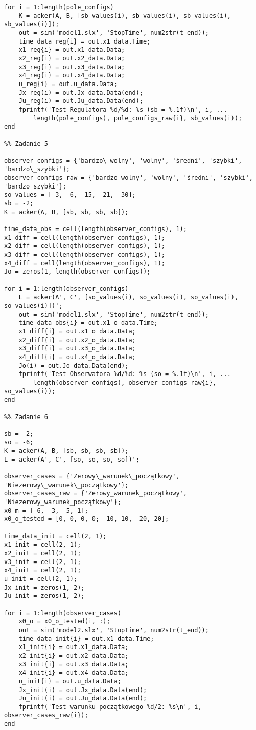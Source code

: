 \documentclass[a4paper,titlepage,11pt,floatssmall]{mwrep} %
\begin{document}
\begin{lstlisting}[style=custommatlab, caption={Pełny kod skryptu \texttt{combined\_plots.m}.}, label={lst:init_full}]
for i = 1:length(pole_configs)
    K = acker(A, B, [sb_values(i), sb_values(i), sb_values(i), sb_values(i)]);
    out = sim('model1.slx', 'StopTime', num2str(t_end));
    time_data_reg{i} = out.x1_data.Time;
    x1_reg{i} = out.x1_data.Data;
    x2_reg{i} = out.x2_data.Data;
    x3_reg{i} = out.x3_data.Data;
    x4_reg{i} = out.x4_data.Data;
    u_reg{i} = out.u_data.Data;
    Jx_reg(i) = out.Jx_data.Data(end);
    Ju_reg(i) = out.Ju_data.Data(end);
    fprintf('Test Regulatora %d/%d: %s (sb = %.1f)\n', i, ...
        length(pole_configs), pole_configs_raw{i}, sb_values(i));
end

%% Zadanie 5

observer_configs = {'bardzo\_wolny', 'wolny', 'średni', 'szybki', 'bardzo\_szybki'};
observer_configs_raw = {'bardzo_wolny', 'wolny', 'średni', 'szybki', 'bardzo_szybki'};
so_values = [-3, -6, -15, -21, -30];
sb = -2;
K = acker(A, B, [sb, sb, sb, sb]);

time_data_obs = cell(length(observer_configs), 1);
x1_diff = cell(length(observer_configs), 1);
x2_diff = cell(length(observer_configs), 1);
x3_diff = cell(length(observer_configs), 1);
x4_diff = cell(length(observer_configs), 1);
Jo = zeros(1, length(observer_configs));

for i = 1:length(observer_configs)
    L = acker(A', C', [so_values(i), so_values(i), so_values(i), so_values(i)])';
    out = sim('model1.slx', 'StopTime', num2str(t_end));
    time_data_obs{i} = out.x1_o_data.Time;
    x1_diff{i} = out.x1_o_data.Data;
    x2_diff{i} = out.x2_o_data.Data;
    x3_diff{i} = out.x3_o_data.Data;
    x4_diff{i} = out.x4_o_data.Data;
    Jo(i) = out.Jo_data.Data(end);
    fprintf('Test Obserwatora %d/%d: %s (so = %.1f)\n', i, ...
        length(observer_configs), observer_configs_raw{i}, so_values(i));
end

%% Zadanie 6

sb = -2;
so = -6;
K = acker(A, B, [sb, sb, sb, sb]);
L = acker(A', C', [so, so, so, so])';

observer_cases = {'Zerowy\_warunek\_początkowy', 'Niezerowy\_warunek\_początkowy'};
observer_cases_raw = {'Zerowy_warunek_początkowy', 'Niezerowy_warunek_początkowy'};
x0_m = [-6, -3, -5, 1];
x0_o_tested = [0, 0, 0, 0; -10, 10, -20, 20];

time_data_init = cell(2, 1);
x1_init = cell(2, 1);
x2_init = cell(2, 1);
x3_init = cell(2, 1);
x4_init = cell(2, 1);
u_init = cell(2, 1);
Jx_init = zeros(1, 2);
Ju_init = zeros(1, 2);

for i = 1:length(observer_cases)
    x0_o = x0_o_tested(i, :);
    out = sim('model2.slx', 'StopTime', num2str(t_end));
    time_data_init{i} = out.x1_data.Time;
    x1_init{i} = out.x1_data.Data;
    x2_init{i} = out.x2_data.Data;
    x3_init{i} = out.x3_data.Data;
    x4_init{i} = out.x4_data.Data;
    u_init{i} = out.u_data.Data;
    Jx_init(i) = out.Jx_data.Data(end);
    Ju_init(i) = out.Ju_data.Data(end);
    fprintf('Test warunku początkowego %d/2: %s\n', i, observer_cases_raw{i});
end


\end{lstlisting}
\end{document}
